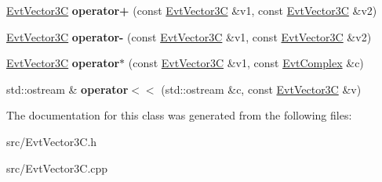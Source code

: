 \begin{DoxyCompactItemize}
\item 
\hypertarget{class_evt_vector3_c_a66ff88edf8454fb582daa1704d55f6a7}{}\hyperlink{class_evt_vector3_c}{Evt\+Vector3\+C} {\bfseries operator+} (const \hyperlink{class_evt_vector3_c}{Evt\+Vector3\+C} \&v1, const \hyperlink{class_evt_vector3_c}{Evt\+Vector3\+C} \&v2)\label{class_evt_vector3_c_a66ff88edf8454fb582daa1704d55f6a7}

\item 
\hypertarget{class_evt_vector3_c_ab84f6a740a2472c72f973e3289c807ca}{}\hyperlink{class_evt_vector3_c}{Evt\+Vector3\+C} {\bfseries operator-\/} (const \hyperlink{class_evt_vector3_c}{Evt\+Vector3\+C} \&v1, const \hyperlink{class_evt_vector3_c}{Evt\+Vector3\+C} \&v2)\label{class_evt_vector3_c_ab84f6a740a2472c72f973e3289c807ca}

\item 
\hypertarget{class_evt_vector3_c_af5dbb4cf03778c644d564c182b0d22b7}{}\hyperlink{class_evt_vector3_c}{Evt\+Vector3\+C} {\bfseries operator$\ast$} (const \hyperlink{class_evt_vector3_c}{Evt\+Vector3\+C} \&v1, const \hyperlink{class_evt_complex}{Evt\+Complex} \&c)\label{class_evt_vector3_c_af5dbb4cf03778c644d564c182b0d22b7}

\item 
\hypertarget{class_evt_vector3_c_aa48c6a4de725740a60eeb41fc0c04fa6}{}std\+::ostream \& {\bfseries operator$<$$<$} (std\+::ostream \&c, const \hyperlink{class_evt_vector3_c}{Evt\+Vector3\+C} \&v)\label{class_evt_vector3_c_aa48c6a4de725740a60eeb41fc0c04fa6}

\end{DoxyCompactItemize}


The documentation for this class was generated from the following files\+:\begin{DoxyCompactItemize}
\item 
src/Evt\+Vector3\+C.\+h\item 
src/Evt\+Vector3\+C.\+cpp\end{DoxyCompactItemize}

